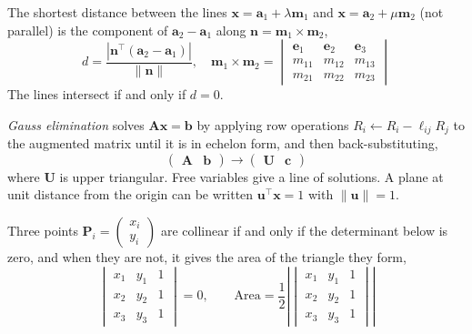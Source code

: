\item The shortest distance between the lines $\mathbf{x} = \mathbf{a}_1 + \lambda\mathbf{m}_1$ and $\mathbf{x} = \mathbf{a}_2 + \mu\mathbf{m}_2$ (not parallel) is the component of $\mathbf{a}_2 - \mathbf{a}_1$ along $\mathbf{n} = \mathbf{m}_1 \times \mathbf{m}_2$,
\begin{equation}
d = \frac{\left|\mathbf{n}^{\top}(\mathbf{a}_2 - \mathbf{a}_1)\right|}{\|\mathbf{n}\|}, \quad
\mathbf{m}_1 \times \mathbf{m}_2 = \begin{vmatrix} \mathbf{e}_1 & \mathbf{e}_2 & \mathbf{e}_3 \\ m_{11} & m_{12} & m_{13} \\ m_{21} & m_{22} & m_{23} \end{vmatrix}
\label{c12eq:skew}
\end{equation}
The lines intersect if and only if $d = 0$.

\item \emph{Gauss elimination} solves $\mathbf{A}\mathbf{x} = \mathbf{b}$ by applying row operations $R_i \leftarrow R_i - \ell_{ij}R_j$ to the augmented matrix until it is in echelon form, and then back-substituting,
\begin{equation}
\begin{pmatrix} \mathbf{A} & \mathbf{b} \end{pmatrix} \longrightarrow \begin{pmatrix} \mathbf{U} & \mathbf{c} \end{pmatrix}
\label{c12eq:gauss}
\end{equation}
where $\mathbf{U}$ is upper triangular. Free variables give a line of solutions. A plane at unit distance from the origin can be written $\mathbf{u}^{\top}\mathbf{x} = 1$ with $\|\mathbf{u}\| = 1$.

\item Three points $\mathbf{P}_i = \begin{pmatrix} x_i \\ y_i \end{pmatrix}$ are collinear if and only if the determinant below is zero, and when they are not, it gives the area of the triangle they form,
\begin{equation}
\begin{vmatrix} x_1 & y_1 & 1 \\ x_2 & y_2 & 1 \\ x_3 & y_3 & 1 \end{vmatrix} = 0, \qquad
\text{Area} = \frac{1}{2}\left|\begin{vmatrix} x_1 & y_1 & 1 \\ x_2 & y_2 & 1 \\ x_3 & y_3 & 1 \end{vmatrix}\right|
\label{c12eq:area}
\end{equation}
